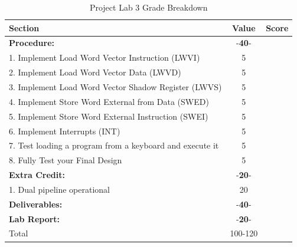 \documentclass{article}
\begin{document}
\begin{table}[!htb]
  \begin{center}
    \begin{tabular}[width=0.9\textwidth]{|l|c|l|}
       \hline
       Section & Value & Score\\
       \hline 
       \multicolumn{1}{|l}{\textbf{Procedure:}}  & -\textbf{40}- &\\
       \hline
       1. Implement Load Word Vector Instruction (LWVI) & 5 &\\
       \hline
       2. Implement Load Word Vector Data  (LWVD) & 5 &\\
       \hline
       3. Implement Load Word Vector Shadow Register (LWVS) & 5 &\\
       \hline
       4. Implement Store Word External from Data (SWED) & 5 &\\
       \hline
       5. Implement Store Word External Instruction (SWEI) & 5 &\\
       \hline
       6. Implement Interrupts (INT) & 5 &\\
       \hline
       7. Test loading a program from a keyboard and execute it & 5 &\\
       \hline
       8. Fully Test your Final Design & 5 &\\
       \hline 
       \multicolumn{1}{|l}{\textbf{Extra Credit:}}  & -\textbf{20}- &\\
       \hline
       1. Dual pipeline operational & 20 &\\
       \hline
       \multicolumn{1}{|l}{\textbf{Deliverables:}}  & -\textbf{40}- &\\
       \hline
       \multicolumn{1}{|l}{\textbf{Lab Report:}}  & -\textbf{20}- &\\
       \hline
       \hline
       \multicolumn{1}{|l}{Total} & \multicolumn{1}{c|}{100-120} &\\
       \hline
    \end{tabular}
  \end{center}
  \caption{Project Lab 3 Grade Breakdown}
\end{table}
\end{document}
